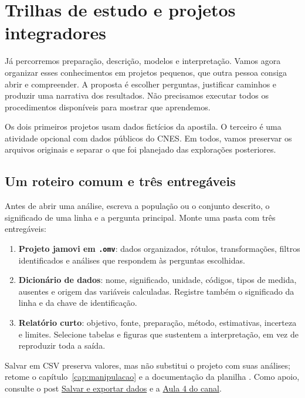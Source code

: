 \chapter{Trilhas de estudo e projetos integradores}
\label{cap:projetos}

Já percorremos preparação, descrição, modelos e interpretação. Vamos agora organizar esses conhecimentos em projetos pequenos, que outra pessoa consiga abrir e compreender. A proposta é escolher perguntas, justificar caminhos e produzir uma narrativa dos resultados. Não precisamos executar todos os procedimentos disponíveis para mostrar que aprendemos.

Os dois primeiros projetos usam dados fictícios da apostila. O terceiro é uma atividade opcional com dados públicos do CNES. Em todos, vamos preservar os arquivos originais e separar o que foi planejado das explorações posteriores.

\section{Um roteiro comum e três entregáveis}

Antes de abrir uma análise, escreva a população ou o conjunto descrito, o significado de uma linha e a pergunta principal. Monte uma pasta com três entregáveis:

\begin{enumerate}
  \item \textbf{Projeto jamovi em \texttt{.omv}}: dados organizados, rótulos, transformações, filtros identificados e análises que respondem às perguntas escolhidas.
  \item \textbf{Dicionário de dados}: nome, significado, unidade, códigos, tipos de medida, ausentes e origem das variáveis calculadas. Registre também o significado da linha e da chave de identificação.
  \item \textbf{Relatório curto}: objetivo, fonte, preparação, método, estimativas, incerteza e limites. Selecione tabelas e figuras que sustentem a interpretação, em vez de reproduzir toda a saída.
\end{enumerate}

Salvar em CSV preserva valores, mas não substitui o projeto com suas análises; retome o capítulo~\ref{cap:manipulacao} e a documentação da planilha \parencite{JamoviPlanilha}. Como apoio, consulte o post \href{https://www.balaiocientifico.com/2024/04/salvar-e-exportar-dados-no-jamovi.html}{Salvar e exportar dados} e a \href{https://www.youtube.com/watch?v=tspLxfl3uZk}{Aula 4 do canal}.

